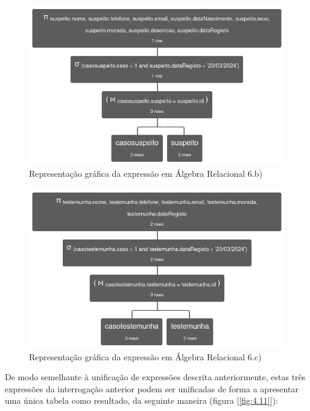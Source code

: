 \documentclass[a4paper,12pt]{scrreprt}
\begin{document}
\begin{figure}[!ht]
    \centering
    \includegraphics[scale=0.63]{images/relax/6-b.png}
    \caption{Representação gráfica da expressão em Álgebra Relacional 6.b)}
    \label{fig:4.9}
\end{figure}
\vspace{0cm}
\begin{figure}[!ht]
    \centering
    \includegraphics[scale=0.63]{images/relax/6-c.png}
    \caption{Representação gráfica da expressão em Álgebra Relacional 6.c)}
    \label{fig:4.10}
\end{figure}

\clearpage

De modo semelhante à unificação de expressões descrita anteriormente, estas três expressões da interrogação anterior podem ser unificadas de forma a apresentar uma única tabela como resultado, da seguinte maneira (figura [\ref{fig:4.11}]):
\end{document}
